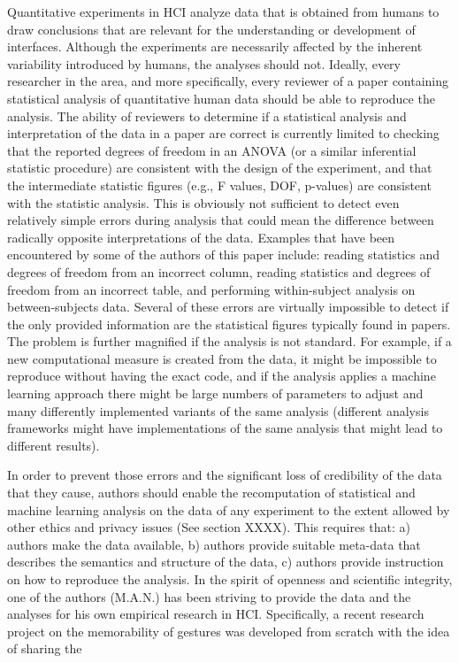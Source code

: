 Quantitative experiments in HCI analyze data that is obtained from humans to draw conclusions that are relevant for the understanding or development of interfaces. Although the experiments are necessarily affected by the inherent variability introduced by humans, the analyses should not. Ideally, every researcher in the area, and more specifically, every reviewer of a paper containing statistical analysis of quantitative human data should be able to reproduce the analysis. The ability of reviewers to determine if a statistical analysis and interpretation of the data in a paper are correct is currently limited to checking that the reported degrees of freedom in an ANOVA (or a similar inferential statistic procedure) are consistent with the design of the experiment, and that the intermediate statistic figures (e.g., F values, DOF, p-values) are consistent with the statistic analysis. This is obviously not sufficient to detect even relatively simple errors during analysis that could mean the difference between radically opposite interpretations of the data. Examples that have been encountered by some of the authors of this paper include: reading statistics and degrees of freedom from an incorrect column, reading statistics and degrees of freedom from an incorrect table, and performing within-subject analysis on between-subjects data. Several of these errors are virtually impossible to detect if the only provided information are the statistical figures typically found in papers. The problem is further magnified if the analysis is not standard. For example, if a new computational measure is created from the data, it might be impossible to reproduce without having the exact code, and if the analysis applies a machine learning approach there might be large numbers of parameters to adjust and many differently implemented variants of the same analysis (different analysis frameworks might have implementations of the same analysis that might lead to different results).

In order to prevent those errors and the significant loss of credibility of the data that they cause, authors should enable the recomputation of statistical and machine learning analysis on the data of any experiment to the extent allowed by other ethics and privacy issues (See section XXXX). This requires that: a) authors make the data available, b) authors provide suitable meta-data that describes the semantics and structure of the data, c) authors provide instruction on how to reproduce the analysis. In the spirit of openness and scientific integrity, one of the authors (M.A.N.) has been striving to provide the data and the analyses for his own empirical research in HCI. Specifically, a recent research project on the memorability of gestures \cite{Nacenta} was developed from scratch with the idea of sharing the 



